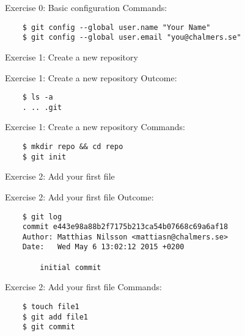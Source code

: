 \documentclass{beamer}
\begin{document}
\begin{frame}[fragile]{Exercise 0: Basic configuration}
  Commands:

  \begin{verbatim}
    $ git config --global user.name "Your Name"
    $ git config --global user.email "you@chalmers.se"
  \end{verbatim}
\end{frame}

\begin{frame}{}
  \center
  \Huge Exercise 1: Create a new repository
\end{frame}

\begin{frame}[fragile]{Exercise 1: Create a new repository}
  Outcome:

  \begin{verbatim}
    $ ls -a
    . .. .git
  \end{verbatim}
\end{frame}

\begin{frame}[fragile]{Exercise 1: Create a new repository}
  Commands:

  \begin{verbatim}
    $ mkdir repo && cd repo
    $ git init
  \end{verbatim}
\end{frame}

\begin{frame}{}
  \center
  \Huge Exercise 2: Add your first file
\end{frame}

\begin{frame}[fragile]{Exercise 2: Add your first file}
  Outcome:

  \begin{verbatim}
    $ git log
    commit e443e98a88b2f7175b213ca54b07668c69a6af18
    Author: Matthias Nilsson <mattiasn@chalmers.se>
    Date:   Wed May 6 13:02:12 2015 +0200

        initial commit
  \end{verbatim}
\end{frame}

\begin{frame}[fragile]{Exercise 2: Add your first file}
  Commands:

  \begin{verbatim}
    $ touch file1
    $ git add file1
    $ git commit
  \end{verbatim}
\end{frame}
\end{document}
